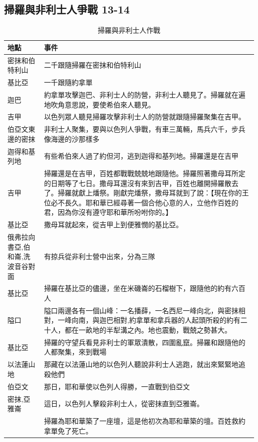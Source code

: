 \subsection{掃羅與非利士人爭戰 13-14}
\begin{table}[H]
\centering 
\begin{tabular}{p{3.5cm}|p{12cm}}\hline\hline
地點 & 事件\\\hline
密抹和伯特利山 &二千跟隨掃羅在密抹和伯特利山 \\\hline
基比亞&一千跟隨約拿單\\\hline
迦巴& 約拿單攻擊迦巴、非利士人的防營，非利士人聽見了。掃羅就在遍地吹角意思說，要使希伯來人聽見。 \\\hline 
吉甲&以色列眾人聽見掃羅攻擊非利士人的防營就跟隨掃羅聚集在吉甲。\\\hline 
伯亞文東邊的密抹&非利士人聚集，要與以色列人爭戰，有車三萬輛，馬兵六千，步兵像海邊的沙那樣多\\\hline
迦得和基列地&有些希伯來人過了約但河，逃到迦得和基列地。掃羅還是在吉甲\\\hline
吉甲&掃羅還是在吉甲，百姓都戰戰兢兢地跟隨他。掃羅照著撒母耳所定的日期等了七日。撒母耳還沒有來到吉甲，百姓也離開掃羅散去了。掃羅就獻上燔祭。剛獻完燔祭，撒母耳就到了說：【現在你的王位必不長久。耶和華已經尋著一個合他心意的人，立他作百姓的君，因為你沒有遵守耶和華所吩咐你的。】 \\\hline
基比亞&撒母耳就起來，從吉甲上到便雅憫的基比亞。\\\hline
俄弗拉向書亞,伯和崙,洗波音谷對面&有掠兵從非利士營中出來，分為三隊\\\hline
基比亞&掃羅在基比亞的儘邊，坐在米磯崙的石榴樹下，跟隨他的約有六百人\\\hline
隘口&隘口兩邊各有一個山峰：一名播薛，一名西尼一峰向北，與密抹相對，一峰向南，與迦巴相對,約拿單和拿兵器的人起頭所殺的約有二十人，都在一畝地的半犁溝之內。地也震動，戰兢之勢甚大。\\\hline
基比亞&掃羅的守望兵看見非利士的軍眾潰散，四圍亂竄。掃羅和跟隨他的人都聚集，來到戰場\\\hline
以法蓮山地&那藏在以法蓮山地的以色列人聽說非利士人逃跑，就出來緊緊地追殺他們\\\hline
伯亞文&那日，耶和華使以色列人得勝，一直戰到伯亞文\\\hline
密抹,亞雅崙&這日，以色列人擊殺非利士人，從密抹直到亞雅崙。\\\hline
&掃羅為耶和華築了一座壇，這是他初次為耶和華築的壇。百姓救約拿單免了死亡。\\\hline
\end{tabular}
\caption{掃羅與非利士人作戰}
\end{table}


